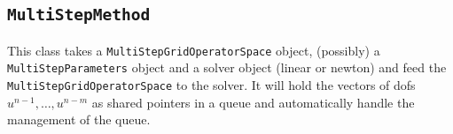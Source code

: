 \documentclass[11pt,a4paper,DIV11,%
notitlepage,oneside,abstracton,%
bibtotoc]{scrartcl}
\begin{document}
\subsection{\tt MultiStepMethod}

This class takes a {\tt MultiStepGridOperatorSpace} object, (possibly) a {\tt
  MultiStepParameters} object and a solver object (linear or newton) and feed
the {\tt MultiStepGridOperatorSpace} to the solver.  It will hold the vectors
of dofs $u^{n-1},\ldots,u^{n-m}$ as shared pointers in a queue and
automatically handle the management of the queue.
\end{document}
